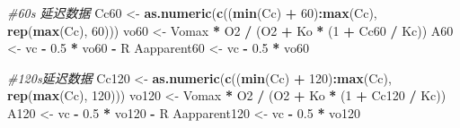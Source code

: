 \documentclass[
]{krantz}
\makeatletter
\newenvironment{Shaded}{\begin{snugshade}}{\end{snugshade}}
\newcommand{\CommentTok}[1]{\textcolor[rgb]{0.56,0.35,0.01}{\textit{#1}}}
\newcommand{\DecValTok}[1]{\textcolor[rgb]{0.00,0.00,0.81}{#1}}
\newcommand{\FloatTok}[1]{\textcolor[rgb]{0.00,0.00,0.81}{#1}}
\newcommand{\KeywordTok}[1]{\textcolor[rgb]{0.13,0.29,0.53}{\textbf{#1}}}
\newcommand{\NormalTok}[1]{#1}
\newcommand{\OperatorTok}[1]{\textcolor[rgb]{0.81,0.36,0.00}{\textbf{#1}}}
\newcommand{\StringTok}[1]{\textcolor[rgb]{0.31,0.60,0.02}{#1}}
\newenvironment{kframe}{%
\medskip{}
\setlength{\fboxsep}{.8em}
 \def\at@end@of@kframe{}%
 \ifinner\ifhmode%
  \def\at@end@of@kframe{\end{minipage}}%
  \begin{minipage}{\columnwidth}%
 \fi\fi%
 \def\FrameCommand##1{\hskip\@totalleftmargin \hskip-\fboxsep
 \colorbox{shadecolor}{##1}\hskip-\fboxsep
     \hskip-\linewidth \hskip-\@totalleftmargin \hskip\columnwidth}%
 \MakeFramed {\advance\hsize-\width
   \@totalleftmargin\z@ \linewidth\hsize
   \@setminipage}}%
 {\par\unskip\endMakeFramed%
 \at@end@of@kframe}
\renewenvironment{Shaded}{\begin{kframe}}{\end{kframe}}
\makeatother
\begin{document}
\begin{Shaded}
\begin{Highlighting}[]
\CommentTok{\#60s 延迟数据}
\NormalTok{Cc60 \textless{}{-}}\StringTok{ }\KeywordTok{as.numeric}\NormalTok{(}\KeywordTok{c}\NormalTok{((}\KeywordTok{min}\NormalTok{(Cc) }\OperatorTok{+}\StringTok{ }\DecValTok{60}\NormalTok{)}\OperatorTok{:}\KeywordTok{max}\NormalTok{(Cc), }\KeywordTok{rep}\NormalTok{(}\KeywordTok{max}\NormalTok{(Cc), }\DecValTok{60}\NormalTok{)))}
\NormalTok{vo60 \textless{}{-}}\StringTok{ }\NormalTok{Vomax }\OperatorTok{*}\StringTok{ }\NormalTok{O2 }\OperatorTok{/}\StringTok{ }\NormalTok{(O2 }\OperatorTok{+}\StringTok{ }\NormalTok{Ko }\OperatorTok{*}\StringTok{ }\NormalTok{(}\DecValTok{1} \OperatorTok{+}\StringTok{ }\NormalTok{Cc60 }\OperatorTok{/}\StringTok{ }\NormalTok{Kc))}
\NormalTok{A60 \textless{}{-}}\StringTok{ }\NormalTok{vc }\OperatorTok{{-}}\StringTok{ }\FloatTok{0.5} \OperatorTok{*}\StringTok{ }\NormalTok{vo60 }\OperatorTok{{-}}\StringTok{ }\NormalTok{R}
\NormalTok{Aapparent60 \textless{}{-}}\StringTok{ }\NormalTok{vc }\OperatorTok{{-}}\StringTok{ }\FloatTok{0.5} \OperatorTok{*}\StringTok{ }\NormalTok{vo60}

\CommentTok{\#120s延迟数据}
\NormalTok{Cc120 \textless{}{-}}\StringTok{ }\KeywordTok{as.numeric}\NormalTok{(}\KeywordTok{c}\NormalTok{((}\KeywordTok{min}\NormalTok{(Cc) }\OperatorTok{+}\StringTok{ }\DecValTok{120}\NormalTok{)}\OperatorTok{:}\KeywordTok{max}\NormalTok{(Cc), }\KeywordTok{rep}\NormalTok{(}\KeywordTok{max}\NormalTok{(Cc), }\DecValTok{120}\NormalTok{)))}
\NormalTok{vo120 \textless{}{-}}\StringTok{ }\NormalTok{Vomax }\OperatorTok{*}\StringTok{ }\NormalTok{O2 }\OperatorTok{/}\StringTok{ }\NormalTok{(O2 }\OperatorTok{+}\StringTok{ }\NormalTok{Ko }\OperatorTok{*}\StringTok{ }\NormalTok{(}\DecValTok{1} \OperatorTok{+}\StringTok{ }\NormalTok{Cc120 }\OperatorTok{/}\StringTok{ }\NormalTok{Kc))}
\NormalTok{A120 \textless{}{-}}\StringTok{ }\NormalTok{vc }\OperatorTok{{-}}\StringTok{ }\FloatTok{0.5} \OperatorTok{*}\StringTok{ }\NormalTok{vo120 }\OperatorTok{{-}}\StringTok{ }\NormalTok{R}
\NormalTok{Aapparent120 \textless{}{-}}\StringTok{ }\NormalTok{vc }\OperatorTok{{-}}\StringTok{ }\FloatTok{0.5} \OperatorTok{*}\StringTok{ }\NormalTok{vo120}


\end{Highlighting}
\end{Shaded}
\end{document}
